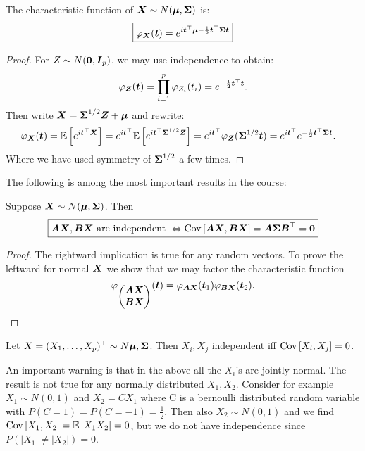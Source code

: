 \begin{theorem}
    The characteristic function of $\boldsymbol{X}\sim N(\boldsymbol{\mu}, \boldsymbol{\Sigma})$ is:
    \begin{equation}
        \boxed{\varphi_{\boldsymbol{X}}(\boldsymbol{t}) = e^{ i \boldsymbol{t}^\top\boldsymbol{\mu} - \frac{1}{2}\boldsymbol{t}^\top\boldsymbol{\Sigma}\boldsymbol{t}}}
    \end{equation}
\end{theorem}
\begin{proof}
    For $Z\sim N(\boldsymbol{0}, \boldsymbol{I}_p)$, we may use independence to obtain:
    $$
        \varphi_{\boldsymbol{Z}}(\boldsymbol{t}) = \prod_{i=1}^p \varphi_{Z_i}(t_i) = e^{-\frac{1}{2} \boldsymbol{t}^\top\boldsymbol{t}}.
    $$
    Then write $\boldsymbol{X}=\boldsymbol{\Sigma}^{1/2} \boldsymbol{Z} + \boldsymbol{\mu}$ and rewrite:
    \begin{align*}
        \varphi_{\boldsymbol{X}}(\boldsymbol{t}) 
        &= \mathbb{E}\left[e^{i\boldsymbol{t}^\top\boldsymbol{X}}\right]
        = e^{i\boldsymbol{t}^\top}\mathbb{E}\left[e^{i\boldsymbol{t}^\top\boldsymbol{\Sigma}^{1/2}\boldsymbol{Z}}\right]
        = e^{i\boldsymbol{t}^\top}\varphi_{\boldsymbol{Z}}(\boldsymbol{\Sigma}^{1/2}\boldsymbol{t})
        = e^{i\boldsymbol{t}^\top}e^{-\frac{1}{2} \boldsymbol{t}^\top\boldsymbol{\Sigma}\boldsymbol{t}}.
    \end{align*}
    Where we have used symmetry of $\boldsymbol{\Sigma}^{1/2}$ a few times.
\end{proof}
The following is among the most important results in the course:
\begin{theorem}
    Suppose $\boldsymbol{X}\sim N(\boldsymbol{\mu}, \boldsymbol{\Sigma})$. Then 
    \begin{equation}
        \boxed{\boldsymbol{A} \boldsymbol{X}, \boldsymbol{B} \boldsymbol{X} \textrm{ are independent } \Leftrightarrow \mathrm{Cov}\left[\boldsymbol{A} \boldsymbol{X}, \boldsymbol{B} \boldsymbol{X}\right] = \boldsymbol{A}\boldsymbol{\Sigma}\boldsymbol{B}^\top = \boldsymbol{0}}
    \end{equation} 
\end{theorem}
\begin{proof}
    The rightward implication is true for any random vectors. To prove the leftward for normal $\boldsymbol{X}$ we show that we may factor the characteristic function 
    $$
    \varphi_{\begin{pmatrix}
        \boldsymbol{A} \boldsymbol{X} \\ \boldsymbol{B} \boldsymbol{X}
    \end{pmatrix}} (\boldsymbol{t}) 
    = \varphi_{\boldsymbol{A}\boldsymbol{X}} (\boldsymbol{t}_1) \varphi_{\boldsymbol{B}\boldsymbol{X}} (\boldsymbol{t}_2).
    $$
\end{proof}
\begin{corollary}
    Let $X = (X_1,\dots,X_p)^\top\sim N{\boldsymbol{\mu}, \boldsymbol{\Sigma}}$. Then $X_i, X_j$ independent iff $\mathrm{Cov}\left[X_i,X_j\right]=0$.
\end{corollary}
\begin{remark}
    An important warning is that in the above all the $X_i$'s are jointly normal. The result is not true for any normally distributed $X_1, X_2$. Consider for example $X_1\sim N(0,1)$ and $X_2 = C X_1$ where C is a bernoulli distributed random variable with $P(C=1) = P(C=-1) = \frac{1}{2}$. Then also $X_2\sim N(0,1)$ and we find $\mathrm{Cov}\left[X_1,X_2\right]=\mathbb{E}\left[X_1X_2\right]=0$, but we do not have independence since $P(|X_1| \ne |X_2|) = 0$.  
\end{remark}
